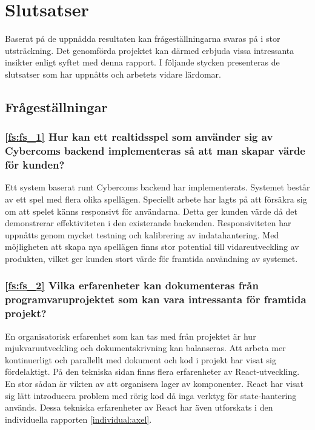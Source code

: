 \chapter{Slutsatser}
\label{cha:slutsatser}

Baserat på de uppnådda resultaten kan frågeställningarna svaras på i stor utsträckning. Det genomförda projektet kan därmed erbjuda vissa intressanta insikter enligt syftet med denna rapport. I följande stycken presenteras de slutsatser som har uppnåtts och arbetets vidare lärdomar.

\section{Frågeställningar}

\subsection*{\ref{fs:fs_1} Hur kan ett realtidsspel som använder sig av Cybercoms backend implementeras så att man skapar värde för kunden?}

Ett system baserat runt Cybercoms backend har implementerats. Systemet består av ett spel med flera olika spellägen. Speciellt arbete har lagts på att försäkra sig om att spelet känns responsivt för användarna. Detta ger kunden värde då det demonstrerar effektiviteten i den existerande backenden. Responsiviteten har uppnåtts genom mycket testning och kalibrering av indatahantering. Med möjligheten att skapa nya spellägen finns stor potential till vidareutveckling av produkten, vilket ger kunden stort värde för framtida användning av systemet.

\subsection*{\ref{fs:fs_2} Vilka erfarenheter kan dokumenteras från programvaruprojektet som kan vara intressanta för framtida projekt?}

En organisatorisk erfarenhet som kan tas med från projektet är hur mjukvaruutveckling och dokumentskrivning kan balanseras. Att arbeta mer kontinuerligt och parallellt med dokument och kod i projekt har visat sig fördelaktigt. På den tekniska sidan finns flera erfarenheter av React-utveckling. En stor sådan är vikten av att organisera lager av komponenter. React har visat sig lätt introducera problem med rörig kod då inga verktyg för state-hantering används. Dessa tekniska erfarenheter av React har även utforskats i den individuella rapporten \ref{individual:axel}.

